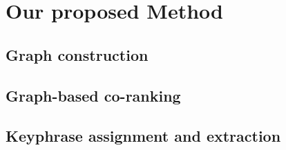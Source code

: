 \section{Our proposed Method}
\label{sec:topicrankpp}

  \subsection{Graph construction}
  \label{subsec:graph_construction}

  \subsection{Graph-based co-ranking}
  \label{subsec:graph_based_co_ranking}

  \subsection{Keyphrase assignment and extraction}
  \label{subsec:keyphrase_assignment_and_extraction}

